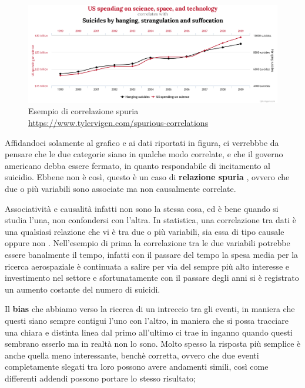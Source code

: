 \begin{figure}[h]
    \begin{center}
        \includegraphics[width=\linewidth]{img/chart.png}
        \caption{Esempio di correlazione spuria 
        \url{https://www.tylervigen.com/spurious-correlations}}
        \label{fig:spurious_relations}
    \end{center}
\end{figure}

Affidandoci solamente al grafico e ai dati riportati in 
figura, ci verrebbbe da pensare che le due categorie 
siano in qualche modo correlate, e che il governo 
americano debba essere fermato, in quanto respondabile di 
incitamento al suicidio.
Ebbene non è così, questo è un caso di \textbf{relazione 
spuria} \cite{wiki:Spurious_relationship}, ovvero che due o 
più variabili sono associate ma non causalmente correlate.

Associatività e causalità infatti non sono la stessa cosa,
ed è bene quando si studia l'una, non confondersi con l'altra.
In statistica, una correlazione tra dati è una qualsiasi 
relazione che vi è tra due o più variabili, sia essa di 
tipo causale oppure non \cite{wiki:Correlation}. 
Nell'esempio di prima la correlazione
tra le due variabili potrebbe essere banalmente il tempo, 
infatti con il passare del tempo la spesa media per la 
ricerca aerospaziale è continuata a salire per via 
del sempre più alto interesse e investimento nel settore
e sfortunatamente con il passare degli anni si è registrato
un aumento costante del numero di suicidi. 

Il \textbf{bias} che abbiamo verso la ricerca di un intreccio
tra gli eventi, in maniera che questi siano sempre contigui
l'uno con l'altro, in maniera che si possa tracciare una 
chiara e distinta linea dal primo all'ultimo ci trae in 
inganno quando questi sembrano esserlo ma in realtà non lo sono.
Molto spesso la risposta più semplice è anche quella meno 
interessante, benchè corretta, ovvero che due eventi 
completamente slegati tra loro possono avere andamenti simili, 
così come differenti addendi possono portare lo stesso risultato; 

